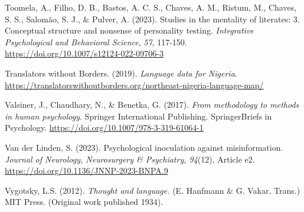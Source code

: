 \documentclass[authordate, reflection]{jote-new-article}
\begin{document}
	Toomela, A., Filho, D. B., Bastos, A. C. S., Chaves, A. M., Ristum, M., Chaves, S. S., Salomão, S. J., \& Pulver, A. (2023). Studies in the mentality of literates: 3. Conceptual structure and nonsense of personality testing. \emph{Integrative Psychological and Behavioral Science}, \emph{57}, 117-150. \url{https://doi.org/10.1007/s12124-022-09706-3}



	Translators without Borders. (2019). \emph{Language data for Nigeria}. \url{https://translatorswithoutborders.org/northeast-nigeria-language-map/}



	Valsiner, J., Chaudhary, N., \& Benetka, G. (2017). \emph{From methodology to methods in human psychology}. Springer International Publishing. SpringerBriefs in Psychology. \url{https://doi.org/10.1007/978-3-319-61064-1}



	Van der Linden, S. (2023). Psychological inoculation against misinformation. \emph{Journal of Neurology, Neurosurgery \& Psychiatry, 94}(12), Article e2. \url{https://doi.org/10.1136/JNNP-2023-BNPA.9}



	Vygotsky, L.S. (2012). \emph{Thought and language. }(E. Hanfmann \& G. Vakar, Trans.) MIT Press. (Original work published 1934).
\end{document}
